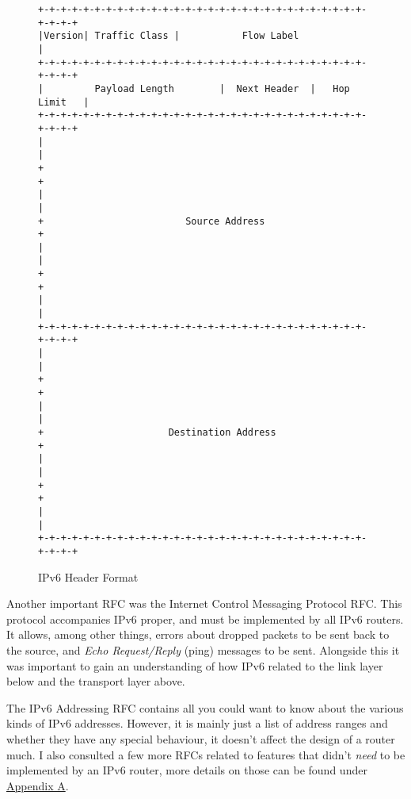 \documentclass[12pt,a4paper,twoside,openright]{report}
\begin{document}
\begin{figure}
\begin{verbatim}
+-+-+-+-+-+-+-+-+-+-+-+-+-+-+-+-+-+-+-+-+-+-+-+-+-+-+-+-+-+-+-+-+
|Version| Traffic Class |           Flow Label                  |
+-+-+-+-+-+-+-+-+-+-+-+-+-+-+-+-+-+-+-+-+-+-+-+-+-+-+-+-+-+-+-+-+
|         Payload Length        |  Next Header  |   Hop Limit   |
+-+-+-+-+-+-+-+-+-+-+-+-+-+-+-+-+-+-+-+-+-+-+-+-+-+-+-+-+-+-+-+-+
|                                                               |
+                                                               +
|                                                               |
+                         Source Address                        +
|                                                               |
+                                                               +
|                                                               |
+-+-+-+-+-+-+-+-+-+-+-+-+-+-+-+-+-+-+-+-+-+-+-+-+-+-+-+-+-+-+-+-+
|                                                               |
+                                                               +
|                                                               |
+                      Destination Address                      +
|                                                               |
+                                                               +
|                                                               |
+-+-+-+-+-+-+-+-+-+-+-+-+-+-+-+-+-+-+-+-+-+-+-+-+-+-+-+-+-+-+-+-+
\end{verbatim}
\caption{IPv6 Header Format\cite{ipv6_rfc}}
\label{fig::ipv6_header}
\end{figure}

\bigskip

Another important RFC was the Internet Control Messaging Protocol RFC\cite{icmpv6_rfc}.  This protocol accompanies IPv6 proper, and must be implemented by all IPv6 routers.  It allows, among other things, errors about dropped packets to be sent back to the source, and \textit{Echo Request/Reply} (ping) messages to be sent.  Alongside this it was important to gain an understanding of how IPv6 related to the link layer below and the transport layer above.

\bigskip

The IPv6 Addressing RFC\cite{ipv6_rfc_adr} contains all you could want to know about the various kinds of IPv6 addresses. However, it is mainly just a list of address ranges and whether they have any special behaviour, it doesn't affect the design of a router much.  I also consulted a few more RFCs related to features that didn't \textit{need} to be implemented by an IPv6 router, more details on those can be found under \hyperref[appendix::requirements]{Appendix A}.
\end{document}
